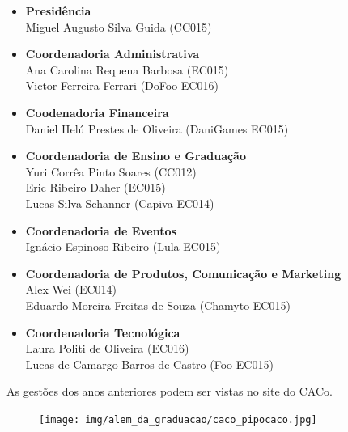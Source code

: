 \begin{itemize}
    \item   \textbf{Presidência}
        \\Miguel Augusto Silva Guida (CC015)

    \item   \textbf{Coordenadoria Administrativa}
        \\Ana Carolina Requena Barbosa (EC015)
        \\Victor Ferreira Ferrari (DoFoo EC016)

    \item   \textbf{Coodenadoria Financeira}
        \\Daniel Helú Prestes de Oliveira (DaniGames EC015)

    \item   \textbf{Coordenadoria de Ensino e Graduação}
        \\Yuri Corrêa Pinto Soares (CC012)
        \\Eric Ribeiro Daher (EC015)
        \\Lucas Silva Schanner (Capiva EC014)
        
    \item   \textbf{Coordenadoria de Eventos}
        \\Ignácio Espinoso Ribeiro (Lula EC015)

    \item   \textbf{Coordenadoria de Produtos, Comunicação e Marketing}
        \\Alex Wei (EC014)
        \\Eduardo Moreira Freitas de Souza (Chamyto EC015)

    \item    \textbf{Coordenadoria Tecnológica}
        \\Laura Politi de Oliveira (EC016)
        \\Lucas de Camargo Barros de Castro (Foo EC015)

\end{itemize}

As gestões dos anos anteriores podem ser vistas no site do CACo.

\begin{figure}[H]
    \centering
    \texttt{[image: img/alem\_da\_graduacao/caco\_pipocaco.jpg]}
\end{figure}
